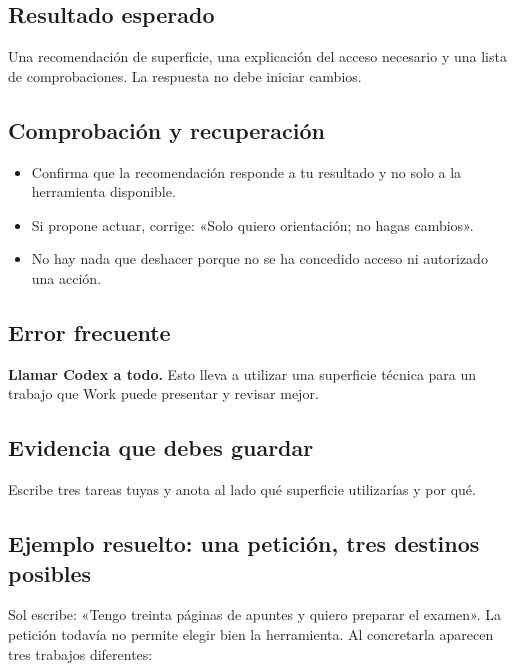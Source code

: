 \documentclass[10pt,a4paper,openany]{book}
\providecommand{\tightlist}{\setlength{\itemsep}{0.18em}\setlength{\parskip}{0pt}}
\begin{document}
\subsection{Resultado esperado}\label{resultado-esperado}

Una recomendación de superficie, una explicación del acceso necesario y
una lista de comprobaciones. La respuesta no debe iniciar cambios.

\subsection{Comprobación y
recuperación}\label{comprobaciuxf3n-y-recuperaciuxf3n}

\begin{itemize}
\tightlist
\item
  Confirma que la recomendación responde a tu resultado y no solo a la
  herramienta disponible.
\item
  Si propone actuar, corrige: «Solo quiero orientación; no hagas
  cambios».
\item
  No hay nada que deshacer porque no se ha concedido acceso ni
  autorizado una acción.
\end{itemize}

\subsection{Error frecuente}\label{error-frecuente}

\textbf{Llamar Codex a todo.} Esto lleva a utilizar una superficie
técnica para un trabajo que Work puede presentar y revisar mejor.

\subsection{Evidencia que debes
guardar}\label{evidencia-que-debes-guardar}

Escribe tres tareas tuyas y anota al lado qué superficie utilizarías y
por qué.

\subsection{Ejemplo resuelto: una petición, tres destinos
posibles}\label{ejemplo-resuelto-una-peticiuxf3n-tres-destinos-posibles}

Sol escribe: «Tengo treinta páginas de apuntes y quiero preparar el
examen». La petición todavía no permite elegir bien la herramienta. Al
concretarla aparecen tres trabajos diferentes:
\end{document}
